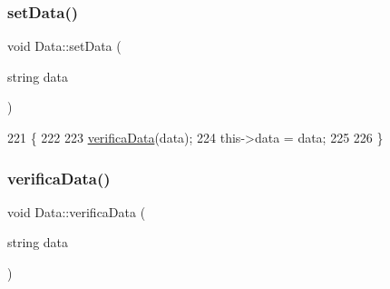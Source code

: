 \subsubsection{\texorpdfstring{set\+Data()}{setData()}}
{\footnotesize\ttfamily void Data\+::set\+Data (\begin{DoxyParamCaption}\item[{string}]{data }\end{DoxyParamCaption})}


\begin{DoxyCode}
221 \{
222 
223     \mbox{\hyperlink{class_data_aa3c7b5fcca1f82689a7f6445e4d222c8}{verificaData}}(data);
224     this->data = data;
225 
226 \}
\end{DoxyCode}
\mbox{\label{class_data_aa3c7b5fcca1f82689a7f6445e4d222c8}} 
\subsubsection{\texorpdfstring{verifica\+Data()}{verificaData()}}
{\footnotesize\ttfamily void Data\+::verifica\+Data (\begin{DoxyParamCaption}\item[{string}]{data }\end{DoxyParamCaption})}


